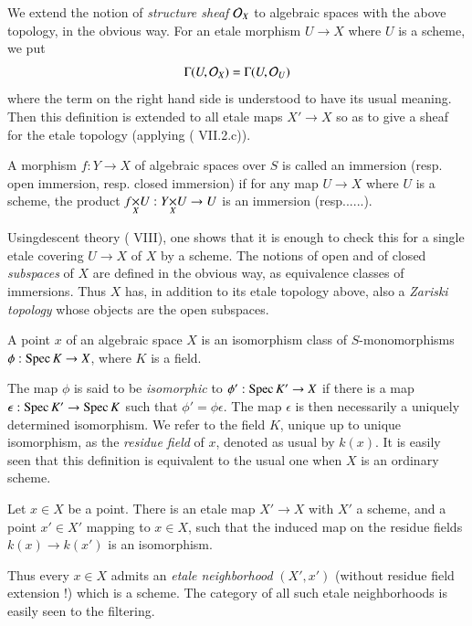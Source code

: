 We extend the notion of {\em structure sheaf} $\mathcal{O}_{X}$ to algebraic spaces with the above topology, in the obvious way. For an etale morphism $U\to X$ where $U$ is a scheme, we put
$$
\Gamma (U,\mathcal{O}_{X})=\Gamma(U,\mathcal{O}_{U})
$$
where the term on the right hand side is understood to have its usual meaning. Then this definition is extended to all etale maps $X'\to X$ so as to give a sheaf for the etale topology (applying (\cite{art02-key6} VII.2.c)).

\begin{definition}\label{art02-defi2.2}
A morphism $f:Y\to X$ of algebraic spaces over $S$ is called an immersion (resp. open immersion, resp. closed immersion) if for any map $U\to X$ where $U$ is a scheme, the product $\fprod{f}{U}{X}:\fprod{Y}{U}{X}\to U$ is an immersion (resp......).
\end{definition}

Using\pageoriginale descent theory (\cite{art02-key14} VIII), one shows that it is enough to check this for a single etale covering $U\to X$ of $X$ by a scheme. The notions of open and of closed {\em subspaces} of $X$ are defined in the obvious way, as equivalence classes of immersions. Thus $X$ has, in addition to its etale topology above, also a {\em Zariski topology} whose objects are the open subspaces.

\begin{definition}\label{art02-defi2.3}
A point $x$ of an algebraic space $X$ is an isomorphism class of $S$-monomorphisms $\phi:\operatorname{\mathrm{Spec}} K\to X$, where $K$ is a field.
\end{definition}

The map $\phi$ is said to be {\em isomorphic} to $\phi':\operatorname{\mathrm{Spec}} K'\to X$ if there is a map $\epsilon : \operatorname{\mathrm{Spec}} K'\to \operatorname{\mathrm{Spec}} K$ such that $\phi'=\phi\epsilon$. The map $\epsilon$ is then necessarily a uniquely determined isomorphism. We refer to the field $K$, unique up to unique isomorphism, as the {\em residue field} of $x$, denoted as usual by $k(x)$. It is easily seen that this definition is equivalent to the usual one when $X$ is an ordinary scheme.

\setcounter{theorem}{3}
\begin{theorem}\label{art02-thm2.4}
Let $x\in X$ be a point. There is an etale map $X'\to X$ with $X'$ a scheme, and a point $x'\in X'$ mapping to $x\in X$, such that the induced map on the residue fields $k(x)\to k(x')$ is an isomorphism.
\end{theorem}

Thus every $x\in X$ admits an {\em etale neighborhood} $(X',x')$ (without residue field extension !) which is a scheme. The category of all such etale neighborhoods is easily seen to the filtering.

